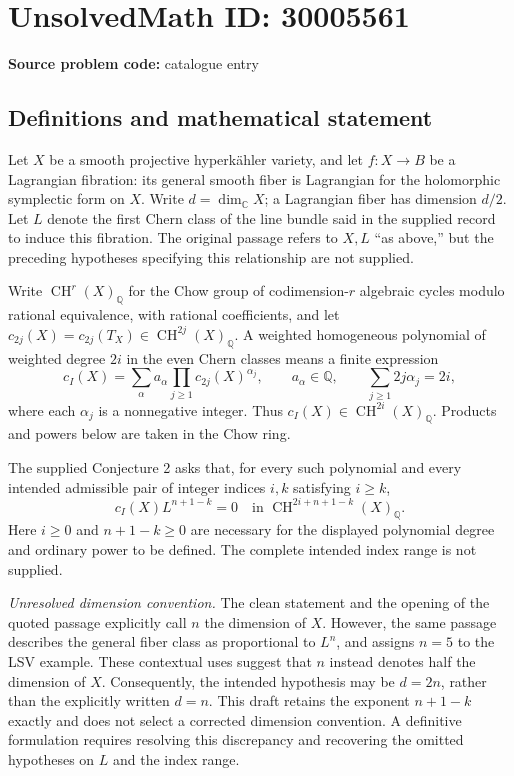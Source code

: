 \documentclass[11pt]{article}
\newcommand{\Q}{\mathbb{Q}}
\newcommand{\C}{\mathbb{C}}
\begin{document}
\section*{UnsolvedMath ID: 30005561}
\textbf{Source problem code:} catalogue entry
\subsection{Definitions and mathematical statement}
Let \(X\) be a smooth projective hyperk\"ahler variety, and let \(f\colon X\to B\) be a Lagrangian fibration: its general smooth fiber is Lagrangian for the holomorphic symplectic form on \(X\). Write \(d=\dim_{\C}X\); a Lagrangian fiber has dimension \(d/2\). Let \(L\) denote the first Chern class of the line bundle said in the supplied record to induce this fibration. The original passage refers to \(X,L\) ``as above,'' but the preceding hypotheses specifying this relationship are not supplied.

Write \(\operatorname{CH}^{r}(X)_{\Q}\) for the Chow group of codimension-\(r\) algebraic cycles modulo rational equivalence, with rational coefficients, and let \(c_{2j}(X)=c_{2j}(T_X)\in\operatorname{CH}^{2j}(X)_{\Q}\). A weighted homogeneous polynomial of weighted degree \(2i\) in the even Chern classes means a finite expression
\[
 c_I(X)=\sum_{\alpha}a_{\alpha}\prod_{j\geq1}c_{2j}(X)^{\alpha_j},
 \qquad a_{\alpha}\in\Q,\qquad
 \sum_{j\geq1}2j\alpha_j=2i,
\]
where each \(\alpha_j\) is a nonnegative integer. Thus \(c_I(X)\in\operatorname{CH}^{2i}(X)_{\Q}\). Products and powers below are taken in the Chow ring.

The supplied Conjecture 2 asks that, for every such polynomial and every intended admissible pair of integer indices \(i,k\) satisfying \(i\geq k\),
\[
 c_I(X)L^{n+1-k}=0
 \quad\text{in }\operatorname{CH}^{2i+n+1-k}(X)_{\Q}.
\]
Here \(i\geq0\) and \(n+1-k\geq0\) are necessary for the displayed polynomial degree and ordinary power to be defined. The complete intended index range is not supplied.

\emph{Unresolved dimension convention.} The clean statement and the opening of the quoted passage explicitly call \(n\) the dimension of \(X\). However, the same passage describes the general fiber class as proportional to \(L^n\), and assigns \(n=5\) to the LSV example. These contextual uses suggest that \(n\) instead denotes half the dimension of \(X\). Consequently, the intended hypothesis may be \(d=2n\), rather than the explicitly written \(d=n\). This draft retains the exponent \(n+1-k\) exactly and does not select a corrected dimension convention. A definitive formulation requires resolving this discrepancy and recovering the omitted hypotheses on \(L\) and the index range.
\end{document}
